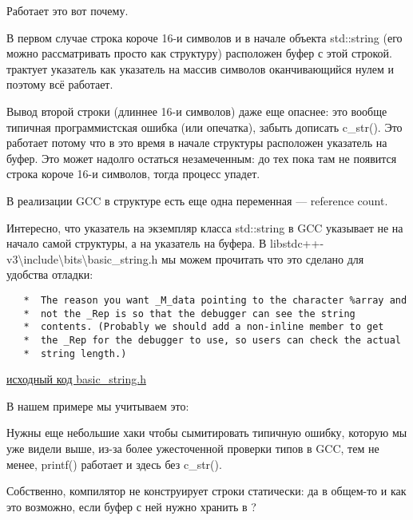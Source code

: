 Работает это вот почему.

В первом случае строка короче 16-и символов и в начале объекта std::string (его можно рассматривать
просто как структуру) расположен буфер с этой строкой.
\printf трактует указатель как указатель на массив символов оканчивающийся нулем и поэтому всё работает.

Вывод второй строки (длиннее 16-и символов) даже еще опаснее: это вообще типичная программистская ошибка 
(или опечатка), забыть дописать c\_str().
Это работает потому что в это время в начале структуры расположен указатель на буфер.
Это может надолго остаться незамеченным: до тех пока там не появится строка 
короче 16-и символов, тогда процесс упадет.


В реализации GCC в структуре есть еще одна переменная --- reference count.

Интересно, что указатель на экземпляр класса std::string в GCC указывает не на начало самой структуры, 
а на указатель на буфера.
В libstdc++-v3\textbackslash{}include\textbackslash{}bits\textbackslash{}basic\_string.h 
мы можем прочитать что это сделано для удобства отладки:

\begin{lstlisting}
   *  The reason you want _M_data pointing to the character %array and
   *  not the _Rep is so that the debugger can see the string
   *  contents. (Probably we should add a non-inline member to get
   *  the _Rep for the debugger to use, so users can check the actual
   *  string length.)
\end{lstlisting}

\href{http://go.yurichev.com/17085}{исходный код basic\_string.h}

В нашем примере мы учитываем это:



Нужны еще небольшие хаки чтобы сымитировать типичную ошибку, которую мы уже видели выше, из-за
более ужесточенной проверки типов в GCC, тем не менее, printf() работает и здесь без c\_str().






Собственно, компилятор не конструирует строки статически: да в общем-то и как
это возможно, если буфер с ней нужно хранить в ?

